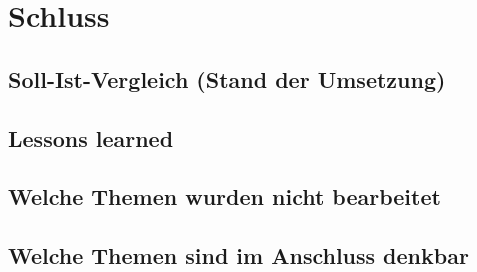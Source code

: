 
\chapter{Schluss}
\section{Soll-Ist-Vergleich (Stand der Umsetzung)}
\section{Lessons learned}
\section{Welche Themen wurden nicht bearbeitet}
\section{Welche Themen sind im Anschluss denkbar}
